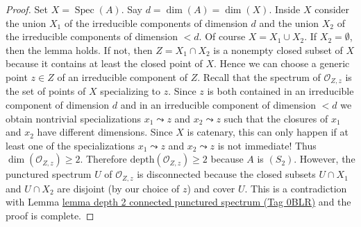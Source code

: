 \documentclass{amsart}
\theoremstyle{plain}
\theoremstyle{definition}
\theoremstyle{remark}
\numberwithin{equation}{subsection}
\def\Spec{\mathop{\mathrm{Spec}}}
\begin{document}
\begin{proof}
Set $X = \Spec(A)$. Say $d = \dim(A) = \dim(X)$. Inside $X$ consider the
union $X_1$ of the irreducible components of dimension $d$ and the union
$X_2$ of the irreducible components of dimension $< d$. Of course
$X = X_1 \cup X_2$. If $X_2 = \emptyset$,
then the lemma holds. If not, then $Z = X_1 \cap X_2$ is a nonempty closed
subset of $X$ because it contains at least the closed point of $X$.
Hence we can choose a generic point $z \in Z$ of an irreducible component
of $Z$. Recall that the spectrum of $\mathcal{O}_{Z, z}$ is the set of points
of $X$ specializing to $z$. Since $z$ is both contained in an
irreducible component of dimension $d$ and in an irreducible component
of dimension $< d$ we obtain nontrivial specializations $x_1 \leadsto z$ and
$x_2 \leadsto z$ such that the closures of $x_1$ and $x_2$ have different
dimensions. Since $X$ is catenary, this can only happen if at least
one of the specializations $x_1 \leadsto z$ and $x_2 \leadsto z$ is not
immediate! Thus $\dim(\mathcal{O}_{Z, z}) \geq 2$. Therefore
$\text{depth}(\mathcal{O}_{Z, z}) \geq 2$ because $A$ is $(S_2)$.
However, the punctured spectrum $U$ of $\mathcal{O}_{Z, z}$ is disconnected
because the closed subsets $U \cap X_1$ and $U \cap X_2$ are disjoint
(by our choice of $z$) and cover $U$. This is a contradiction with
Lemma \href{https://stacks.math.columbia.edu/tag/0BLR}{lemma depth 2 connected punctured spectrum (Tag 0BLR)}
and the proof is complete.
\end{proof}
\end{document}
